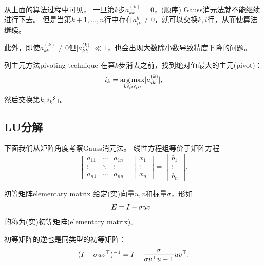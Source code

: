 \begin{remark}
    从上面的算法过程中可见，
    一旦第$k$步$a_{kk}^{(k)} = 0$，(顺序) Gauss消元法就不能继续进行下去。
    但是当第$k + 1,\ldots,n$行中存在$a_{ik}^{k} \neq 0$，就可以交换$k,i$行，从而使算法继续。
\end{remark}

\begin{remark}
    此外，即使$a_{kk}^{(k)} \neq 0$但$\lvert a_{kk}^{(k)}\rvert \ll 1$，也会出现大数除小数导致精度下降的问题。
\end{remark}

\begin{theorem}
    {列主元方法}{pivoting technique}
    在第$k$步消去之前，找到绝对值最大的主元(pivot)：
    \begin{equation}
        i_k = \operatorname*{arg\,max}_{k\leqslant i\leqslant n}\lvert a_{ik}^{(k)}\rvert,
    \end{equation}
    然后交换第$k,i_k$行。
\end{theorem}

\subsection{LU分解}

下面我们从矩阵角度考察Gauss消元法。
线性方程组等价于矩阵方程
\[
    \begin{bmatrix}
        a_{11}&\cdots&a_{1n}\\
        \vdots&\ddots&\vdots\\
        a_{n1}&\cdots&a_{nn}
    \end{bmatrix}\begin{bmatrix}
        x_1\\\vdots\\x_n
    \end{bmatrix} = \begin{bmatrix}
        b_1\\\vdots\\b_n
    \end{bmatrix}.
\]

\begin{definition}
    {初等矩阵}{elementary matrix}
    给定(实)向量$u,v$和标量$\sigma$，形如
    \begin{equation}
        E = I - \sigma uv^\top
    \end{equation}
    的称为(实)初等矩阵(elementary matrix)。
\end{definition}

\begin{corollary}
    初等矩阵的逆也是同类型的初等矩阵：
    \begin{equation}
        (I - \sigma uv^\top)^{-1} = I - \frac{\sigma}{\sigma v^\top u - 1}uv^\top.
    \end{equation}
\end{corollary}

